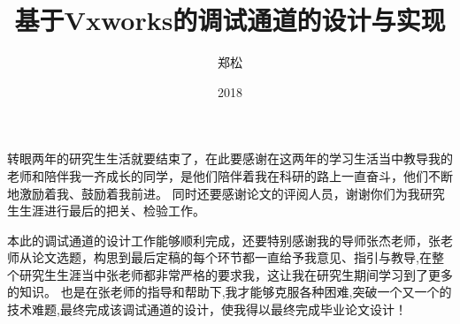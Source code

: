 \documentclass[format=draft,language=chinese,degree=master]{hustthesis}
\title{基于Vxworks的调试通道的设计与实现}{A design and implementation of debug channel based on Vxworks.}
\author{郑松}{Song Zheng}
\date{2018}{3}{26}
\begin{document}
\frontmatter

\maketitle


\makeabstract

\tableofcontents


\mainmatter

\clearpage


\clearpage


\clearpage


\clearpage


\clearpage


\clearpage

\backmatter

\begin{ack}
\indent 转眼两年的研究生生活就要结束了，在此要感谢在这两年的学习生活当中教导我的老师和陪伴我一齐成长的同学，是他们陪伴着我在科研的路上一直奋斗，他们不断地激励着我、鼓励着我前进。
同时还要感谢论文的评阅人员，谢谢你们为我研究生生涯进行最后的把关、检验工作。


\noindent 本此的调试通道的设计工作能够顺利完成，还要特别感谢我的导师张杰老师，张老师从论文选题，构思到最后定稿的每个环节都一直给予我意见、指引与教导,在整个研究生生涯当中张老师都非常严格的要求我，这让我在研究生期间学习到了更多的知识。
也是在张老师的指导和帮助下,我才能够克服各种困难,突破一个又一个的技术难题,最终完成该调试通道的设计，使我得以最终完成毕业论文设计！
\end{ack}

\nocite{*}
% 

\end{document}
